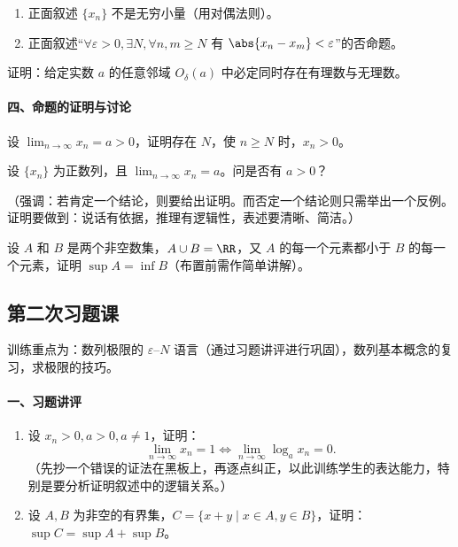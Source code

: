 \begin{xexercise}[4]
\begin{enumerate}[label=(\arabic*)]
    \item 正面叙述 $\{x_n\}$ 不是无穷小量（用对偶法则）。
    \item 正面叙述“$\forall\varepsilon>0,\exists N,\forall n,m\ge N$ 有 $\abs{x_n-x_m}<\varepsilon$”的否命题。
  \end{enumerate}
\end{xexercise}

\begin{xexercise}[5]
证明：给定实数 $a$ 的任意邻域 $O_\delta(a)$ 中必定同时存在有理数与无理数。
\end{xexercise}

\paragraph{四、命题的证明与讨论}

\begin{xexample}[4.1]
设 $\displaystyle\lim_{n\to\infty}x_n=a>0$，证明存在 $N$，使 $n\ge N$ 时，$x_n>0$。
\end{xexample}

\begin{xexample}[4.2]
设 $\{x_n\}$ 为正数列，且 $\displaystyle\lim_{n\to\infty}x_n=a$。问是否有 $a>0$？
\end{xexample}

（强调：若肯定一个结论，则要给出证明。而否定一个结论则只需举出一个反例。证明要做到：说话有依据，推理有逻辑性，表述要清晰、简洁。）

\begin{xexample}[4.3]
设 $A$ 和 $B$ 是两个非空数集，$A\cup B=\RR$，又 $A$ 的每一个元素都小于 $B$ 的每一个元素，证明 $\sup A=\inf B$（布置前需作简单讲解）。
\end{xexample}

\subsection{第二次习题课}

训练重点为：数列极限的 $\varepsilon$--$N$ 语言（通过习题讲评进行巩固），数列基本概念的复习，求极限的技巧。

\paragraph{一、习题讲评}

\begin{enumerate}[label=\arabic*.]
  \item 设 $x_n>0,a>0,a\ne1$，证明：
  \[
    \lim_{n\to\infty}x_n=1
    \Longleftrightarrow
    \lim_{n\to\infty}\log_a x_n=0.
  \]
  （先抄一个错误的证法在黑板上，再逐点纠正，以此训练学生的表达能力，特别是要分析证明叙述中的逻辑关系。）
  \item 设 $A,B$ 为非空的有界集，$C=\{x+y\mid x\in A,y\in B\}$，证明：$\sup C=\sup A+\sup B$。
\end{enumerate}


